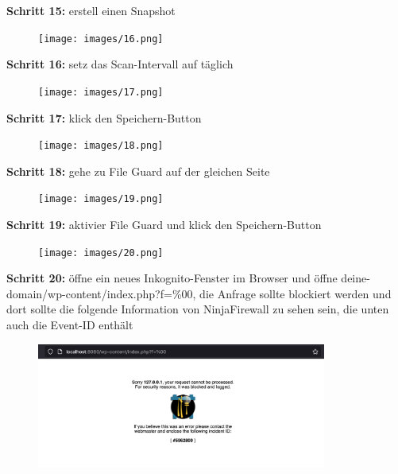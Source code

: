 \documentclass[a4paper]{article}
\begin{document}
\noindent
\textbf{Schritt 15:} erstell einen Snapshot

\begin{figure}[H]
  \centering
  \texttt{[image: images/16.png]}
\end{figure}

\newpage

\noindent
\textbf{Schritt 16:} setz das Scan-Intervall auf täglich

\begin{figure}[H]
  \centering
  \texttt{[image: images/17.png]}
\end{figure}

\noindent
\textbf{Schritt 17:} klick den Speichern-Button

\begin{figure}[H]
  \centering
  \texttt{[image: images/18.png]}
\end{figure}

\noindent
\textbf{Schritt 18:} gehe zu File Guard auf der gleichen Seite

\begin{figure}[H]
  \centering
  \texttt{[image: images/19.png]}
\end{figure}

\noindent
\textbf{Schritt 19:} aktivier File Guard und klick den Speichern-Button

\begin{figure}[H]
  \centering
  \texttt{[image: images/20.png]}
\end{figure}

\newpage

\noindent
\textbf{Schritt 20:} öffne ein neues Inkognito-Fenster im Browser und öffne deine-domain/wp-content/index.php?f=\%00,
die Anfrage sollte blockiert werden und dort sollte die folgende Information von NinjaFirewall zu sehen sein,
die unten auch die Event-ID enthält

\begin{figure}[H]
  \centering
  \includegraphics[width=0.85\textwidth]{images/21.png}
\end{figure}
\end{document}
